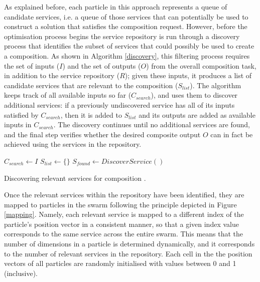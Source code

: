 \documentclass{llncs}
\begin{document}
As explained before, each particle in this approach represents a queue of candidate services, i.e. a queue of those services that can potentially be used to construct a solution that satisfies the composition request. However, before the optimisation process begins the service repository is run through a discovery process \cite{wang2013genetic} that identifies the subset of services that could possibly be used to create a composition. As shown in Algorithm \ref{discovery}, this filtering process requires the set of inputs ($I$) and the set of outputs ($O$) from the overall composition task, in addition to the service repository ($R$); given these inputs, it produces a list of candidate services that are relevant to the composition ($S_{list}$). The algorithm keeps track of all available inputs so far ($C_{search}$), and uses them to discover additional services: if a previously undiscovered service has all of its inputs satisfied by $C_{search}$, then it is added to $S_{list}$ and its outputs are added as available inputs in $C_{search}$. The discovery continues until no additional services are found, and the final step verifies whether the desired composite output $O$ can in fact be achieved using the services in the repository.

\begin{algorithm}
\setlength{}
 \LinesNumbered
 \SetNlSty{}{}{:}
 $C_{search} \leftarrow I$\;
 $S_{list} \leftarrow \{\}$\;
 $S_{found} \leftarrow DiscoverService()$\;
\caption{Discovering relevant services for composition \cite{wang2013genetic}.}
\label{discovery}
\end{algorithm}

Once the relevant services within the repository have been identified, they are mapped to particles in the swarm following the principle depicted in Figure \ref{mapping}. Namely, each relevant service is mapped to a different index of the particle's position vector in a consistent manner, so that a given index value corresponds to the same service across the entire swarm. This means that the number of dimensions in a particle is determined dynamically, and it corresponds to the number of relevant services in the repository. Each cell in the the position vectors of all particles are randomly initialised with values between 0 and 1 (inclusive).
\end{document}
